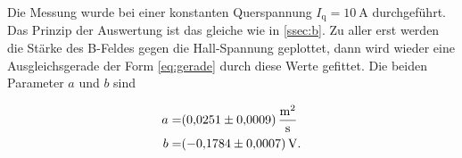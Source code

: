 Die Messung wurde bei einer konstanten Querspannung $I_\text{q} = \SI{10}{\ampere}$ durchgeführt.
Das Prinzip der Auswertung ist das gleiche wie in \autoref{ssec:b}.
Zu aller erst werden die Stärke des B-Feldes gegen die Hall-Spannung geplottet, dann wird wieder eine Ausgleichsgerade der Form \autoref{eq:gerade} durch diese Werte gefittet.
Die beiden Parameter $a$ und $b$ sind

\begin{align*}
    a =& \SI{0.0251(9)}{\meter\squared\per\second} \\
    b =& \SI{-0.1784+-0.0007}{\volt}.
    \label{eq:params_Ib2}
\end{align*}
